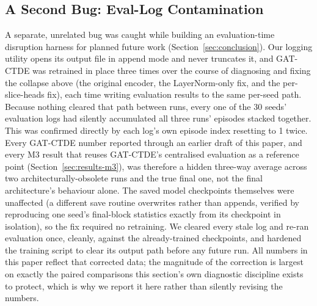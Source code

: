 \documentclass[journal]{IEEEtran}
\begin{document}
\subsection{A Second Bug: Eval-Log Contamination}
\label{sec:eval-log-bug}
A separate, unrelated bug was caught while building an evaluation-time
disruption harness for planned future work (Section~\ref{sec:conclusion}).
Our logging utility opens its output file in append mode and never
truncates it, and GAT-CTDE was retrained in place three times over the
course of diagnosing and fixing the collapse above (the original
encoder, the LayerNorm-only fix, and the per-slice-heads fix), each
time writing evaluation results to the same per-seed path. Because
nothing cleared that path between runs, every one of the 30 seeds'
evaluation logs had silently accumulated all three runs' episodes
stacked together. This was confirmed directly by each log's own episode index
resetting to 1 twice. Every GAT-CTDE number reported through an
earlier draft of this paper, and every M3 result that reuses GAT-CTDE's
centralised evaluation as a reference point
(Section~\ref{sec:results-m3}), was therefore a hidden three-way
average across two architecturally-obsolete runs and the true final
one, not the final architecture's behaviour alone. The saved model
checkpoints themselves were unaffected (a different save routine
overwrites rather than appends, verified by reproducing one seed's
final-block statistics exactly from its checkpoint in isolation), so
the fix required no retraining. We cleared every stale log and
re-ran evaluation once, cleanly, against the already-trained
checkpoints, and hardened the training script to clear its output
path before any future run. All numbers in this paper reflect that
corrected data; the magnitude of the correction is largest on exactly
the paired comparisons this section's own diagnostic discipline exists
to protect, which is why we report it here rather than silently
revising the numbers.
\end{document}
